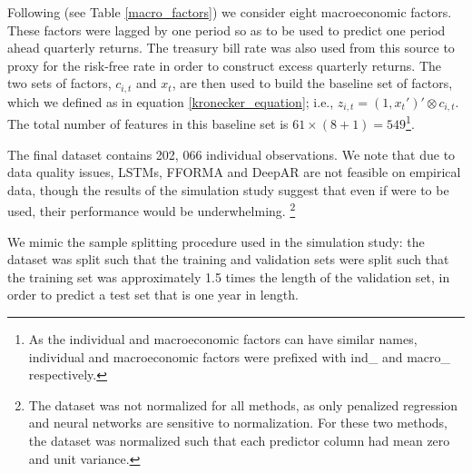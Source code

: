 \documentclass{article}
\begin{document}
Following \cite{welch_comprehensive_2008} (see Table \ref{macro_factors}) we consider eight macroeconomic factors. These factors were lagged by one period so as to be used to predict one period ahead quarterly returns. The treasury bill rate was also used from this source to proxy for the risk-free rate in order to construct excess quarterly returns.  The two sets of factors, $c_{i, t}$ and $x_t$, are then used to build the baseline set of factors, which we defined as in equation \eqref{kronecker_equation}; i.e., $z_{i, t}= (1, x_t')' \otimes c_{i, t}$. The total number of features in this baseline set is $61 \times (8 + 1) = 549$\footnote{As the individual and macroeconomic factors can have similar names, individual and macroeconomic factors were prefixed with ind\_ and macro\_ respectively.}. 

The final dataset contains 202, 066 individual observations. We note that due to data quality issues, LSTMs, FFORMA and DeepAR are not feasible on empirical data, though the results of the simulation study suggest that even if were to be used, their performance would be underwhelming. \footnote{The dataset was not normalized for all methods, as only penalized regression and neural networks are sensitive to normalization. For these two methods, the dataset was normalized such that each predictor column had mean zero and unit variance.}

We mimic the sample splitting procedure used in the simulation study: the dataset was split such that the training and validation sets were split such that the training set was approximately 1.5 times the length of the validation set, in order to predict a test set that is one year in length.
\end{document}

